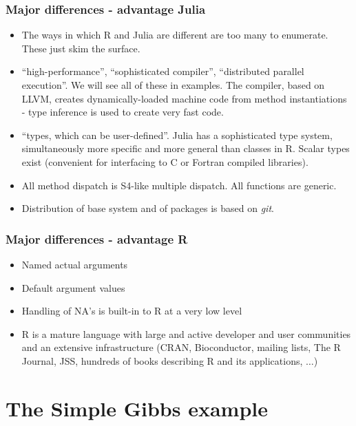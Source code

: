 \documentclass[dvipsnames,pdflatex,beamer]{beamer}
\begin{document}
\begin{frame}
  \frametitle{Major differences - advantage Julia}
  \begin{itemize}
  \item The ways in which R and Julia are different are too many to
    enumerate.  These just skim the surface.
  \item ``high-performance'', ``sophisticated compiler'',
    ``distributed parallel execution''.  We will see all of these in
    examples.  The compiler, based on LLVM, creates dynamically-loaded
    machine code from method instantiations - type inference is used
    to create very fast code.
  \item ``types, which can be user-defined''.  Julia has a
    sophisticated type system, simultaneously more specific and more
    general than classes in R. Scalar types exist (convenient for
    interfacing to C or Fortran compiled libraries).
  \item All method dispatch is S4-like multiple dispatch.  All
    functions are generic.
  \item Distribution of base system and of packages is based on \emph{git}.
  \end{itemize}
\end{frame}
\begin{frame}
  \frametitle{Major differences - advantage R}
  \begin{itemize}
  \item Named actual arguments
  \item Default argument values
  \item Handling of NA's is built-in to R at a very low level
  \item R is a mature language with large and active developer and
    user communities and an extensive infrastructure (CRAN, Bioconductor,
    mailing lists, The R Journal, JSS, hundreds of books describing R
    and its applications, $\dots$)
  \end{itemize}
\end{frame}

\section{The Simple Gibbs example}
\label{sec:simplegibbs}
\end{document}
